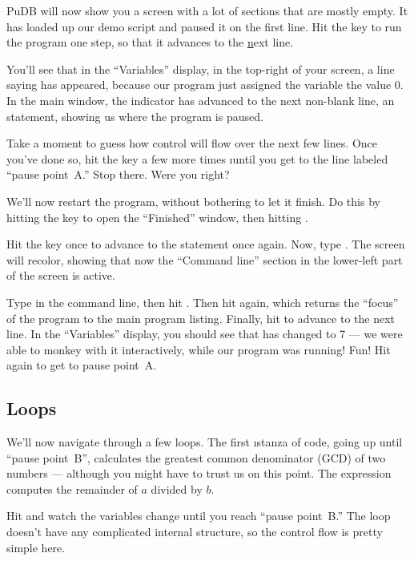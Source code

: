 \documentclass[letterpaper, 12pt, titlepage, twoside]{article}
\begin{document}
PuDB will now show you a screen with a lot of sections that are mostly empty.
It has loaded up our demo script and paused it on the first line. \typeit Hit
the  key to run the program one step, so that it advances to the
\underline{n}ext line.

You'll see that in the ``Variables'' display, in the top-right of your screen,
a line saying  has appeared, because our program just assigned
the variable  the value 0. In the main window, the indicator has advanced
to the next non-blank line, an  statement, showing us where the program
is paused.

Take a moment to guess how control will flow over the next few lines. \typeit
Once you've done so, hit the  key a few more times \i{until you get to
  the line labeled ``pause point~A.''} Stop there. Were you right?

We'll now restart the program, without bothering to let it finish. \typeit Do
this by hitting the  key to open the ``Finished'' window, then hitting
.

\typeit Hit the  key once to advance to the  statement once again.
\typeit Now, type . The screen will recolor, showing that now the
``Command line'' section in the lower-left part of the screen is active.

\typeit Type  in the command line, then hit . \typeit Then
hit  again, which returns the ``focus'' of the program to the
main program listing. \typeit Finally, hit  to advance to the next line.
In the ``Variables'' display, you should see that  has changed to 7 ---
we were able to monkey with it interactively, while our program was running!
Fun! \typeit Hit  again to get to pause point~A.

\subsection*{Loops}

We'll now navigate through a few loops. The first \i{stanza} of code, going up
until ``pause point~B'', calculates the greatest common denominator (GCD) of
two numbers --- although you might have to trust us on this point. The
expression  computes the remainder of $a$ divided by $b$.

\typeit Hit  and watch the variables change until you reach ``pause
point~B.'' The  loop doesn't have any complicated internal structure,
so the control flow is pretty simple here.
\end{document}
